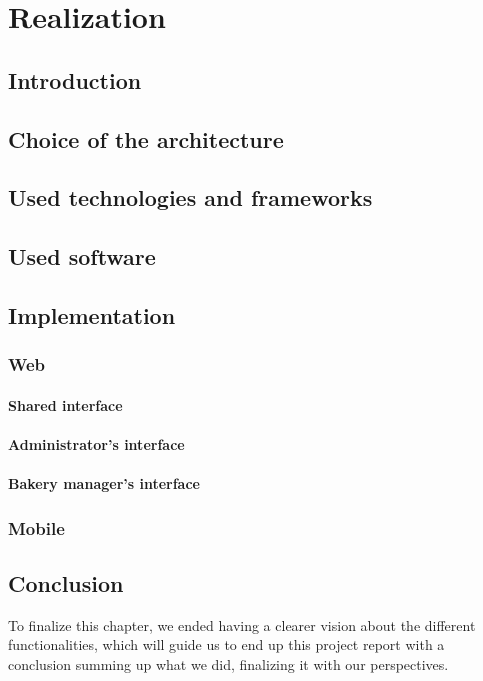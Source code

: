 \documentclass[12pt,a4paper]{report}
\begin{document}
	
	\chapter{Realization}
	\section*{Introduction}
	
	\section{Choice of the architecture}
	
	
	\section{Used technologies and frameworks}
	
	\section{Used software}
	
	
	\section{Implementation}
	\subsection{Web}
	\subsubsection{Shared interface}
	
	\subsubsection{Administrator's interface}
	
	\subsubsection{Bakery manager's interface}
	
	\subsection{Mobile}
	
	
	\section*{Conclusion}
	To finalize this chapter, we ended having a clearer vision about the different functionalities, which will guide us to end up this project report with a conclusion summing up what we did, finalizing it with  our perspectives.	
	
\end{document}
